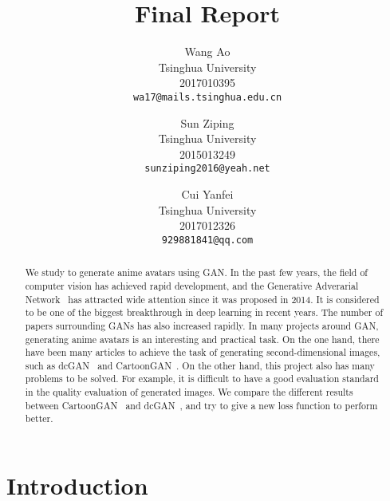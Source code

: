 \documentclass[10pt,twocolumn,letterpaper]{article}
\begin{document}
\title{Final Report}

\author{Wang Ao\\
Tsinghua University\\
2017010395\\
{\tt\small wa17@mails.tsinghua.edu.cn}
\and
Sun Ziping\\
Tsinghua University\\
2015013249\\
{\tt\small sunziping2016@yeah.net}
\and
Cui Yanfei\\
Tsinghua University\\
2017012326\\
{\tt\small 929881841@qq.com}
}

\maketitle

\begin{abstract}
   We study to generate anime avatars using GAN. In the past few years,
   the field of computer vision has achieved rapid development, and the Generative Adverarial
   Network~\cite{GAN} has attracted wide attention since it was proposed in 2014.
   It is considered to be one of the biggest breakthrough in deep learning in recent
   years. The number of papers surrounding GANs has also increased rapidly. In many projects
   around GAN, generating anime avatars is an interesting and practical task. On the
   one hand, there have been many articles to achieve the task of generating
   second-dimensional images, such as dcGAN~\cite{dcGAN} and CartoonGAN~\cite{CartoonGAN}.
   On the other hand, this project also has many problems to be solved. For example,
   it is difficult to have a good evaluation standard in the quality evaluation of generated
   images. We compare the different results between CartoonGAN~\cite{CartoonGAN} and dcGAN~\cite{dcGAN},
   and try to give a new loss function to perform better.
\end{abstract}

\section{Introduction}
\end{document}
